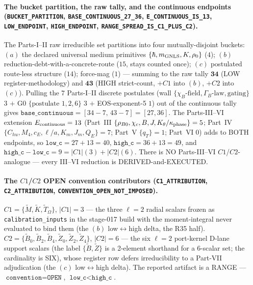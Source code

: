 \paragraph{The bucket partition, the raw tally, and the continuous endpoints (\texttt{BUCKET\_PARTITION}, \texttt{BASE\_CONTINUOUS\_27\_36}, \texttt{E\_CONTINUOUS\_IS\_13}, \texttt{LOW\_ENDPOINT}, \texttt{HIGH\_ENDPOINT}, \texttt{RANGE\_SPREAD\_IS\_C1\_PLUS\_C2}).}
The Parts-I--II raw irreducible set partitions into four mutually-disjoint buckets:
\((a)\) the declared universal medium primitives \(\{\hbar,m_{\rm GNLS},K,\rho_0\}\)
(\(4\)); \((b)\) reduction-debt-with-a-concrete-route (\(15\), stays counted once);
\((c)\) postulated route-less structure (\(14\)); force-mag (\(1\)) --- summing to
the raw tally \(\mathbf{34}\) (LOW register-methodology) and \(\mathbf{43}\) (HIGH
strict-count, \(+C1\) into \((b)\), \(+C2\) into \((c)\)). Pulling the \(7\)
Parts-I--II discrete postulates (wall \(\{\chi_B\text{-field},\Gamma_B\text{-law},
\text{gating}\}\) \(3\) \(+\) G0 \(\{\text{postulate }1,2,6\}\) \(3\) \(+\)
EOS-exponent-5 \(1\)) out of the continuous tally gives
\(\texttt{base\_continuous}=[34-7,\,43-7]=[27,36]\). The Parts-III--VI extension
\(E_{\rm continuous}=13\) (Part~III \(\{\rho_{B0},\chi_c,B,J,K_\theta/\kappa_{\rm
phase}\}=5\); Part~IV \(\{C_{hu},M_4,c_E,\ell/a,K_m,J_m,Q_E\}=7\); Part~V
\(\{q_T\}=1\); Part~VI \(0\)) adds to BOTH endpoints, so
\(\texttt{low\_c}=27+13=40\), \(\texttt{high\_c}=36+13=49\), and
\(\texttt{high\_c}-\texttt{low\_c}=9=|C1|(3)+|C2|(6)\). There is NO Parts-III--VI
\(C1\)/\(C2\)-analogue --- every III--VI reduction is DERIVED-and-EXECUTED.

\paragraph{The \(C1\)/\(C2\) OPEN convention contributors (\texttt{C1\_ATTRIBUTION}, \texttt{C2\_ATTRIBUTION}, \texttt{CONVENTION\_OPEN\_NOT\_IMPOSED}).}
\(C1=\{\tilde M,\tilde K,\tilde T_\Omega\}\), \(|C1|=3\) --- the three \(\ell=2\)
radial scalars frozen as \texttt{calibration\_inputs} in the stage-017 build with the
moment-integral never evaluated to bind them (the \((b)\) low\(\leftrightarrow\)high
delta, the R35 half). \(C2=\{\tilde B_0,\tilde B_2,\tilde B_4,\tilde Z_0,\tilde
Z_2,\tilde Z_4\}\), \(|C2|=6\) --- the six \(\ell=2\) port-kernel D-lane support
scalars (the label \(\{\tilde B,\tilde Z\}\) is a 2-element shorthand for a
6-scalar set; the cardinality is SIX), whose register row defers irreducibility to a
Part-VII adjudication (the \((c)\) low\(\leftrightarrow\)high delta). The reported
artifact is a RANGE --- \(\texttt{convention}=\texttt{OPEN}\),
\(\texttt{low\_c}<\texttt{high\_c}\).

